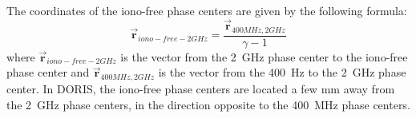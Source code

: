 The coordinates of the iono-free phase centers are given by the following formula:
\begin{equation}
  \vec{\bm{r}}_{iono-free-2GHz} = \frac{\vec{\bm{r}}_{400MHz,2GHz}}{\gamma - 1}
\end{equation}
where \(\vec{\bm{r}}_{iono-free-2GHz}\) is the vector from the \SI{2}{\GHz} 
phase center to the iono-free phase center and \(\vec{\bm{r}}_{400MHz,2GHz}\) 
is the vector from the \SI{400}{\Hz} to the \SI{2}{\GHz} phase center. In 
DORIS, the iono-free phase centers are located a few mm away from the 
\SI{2}{\GHz} phase centers, in the direction opposite to the \SI{400}{\MHz} 
phase centers.
